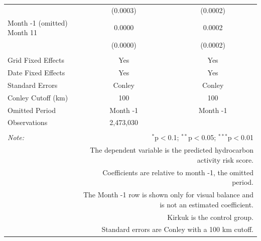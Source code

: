 \begin{table}[!htbp]
\begin{tabular}{@{\extracolsep{5pt}}lcc}
  & (0.0003) & (0.0002) \\ 
  Month -1 (omitted)  \hfill  Month 11 & 0.0000 & 0.0002 \\ 
  & (0.0000) & (0.0002) \\ 
 \hline \\[-1.8ex] 
Grid Fixed Effects & Yes & Yes \\ 
Date Fixed Effects & Yes & Yes \\ 
Standard Errors & Conley & Conley \\ 
Conley Cutoff (km) & 100 & 100 \\ 
Omitted Period & Month -1 & Month -1 \\ 
Observations & 2,473,030 &  \\ 
\hline 
\hline \\[-1.8ex] 
\textit{Note:}  & \multicolumn{2}{r}{$^{*}$p$<$0.1; $^{**}$p$<$0.05; $^{***}$p$<$0.01} \\ 
 & \multicolumn{2}{r}{The dependent variable is the predicted hydrocarbon activity risk score.} \\ 
 & \multicolumn{2}{r}{Coefficients are relative to month -1, the omitted period.} \\ 
 & \multicolumn{2}{r}{The Month -1 row is shown only for visual balance and is not an estimated coefficient.} \\ 
 & \multicolumn{2}{r}{Kirkuk is the control group.} \\ 
 & \multicolumn{2}{r}{Standard errors are Conley with a 100 km cutoff.} \\ 
\end{tabular} 
\end{table} 
